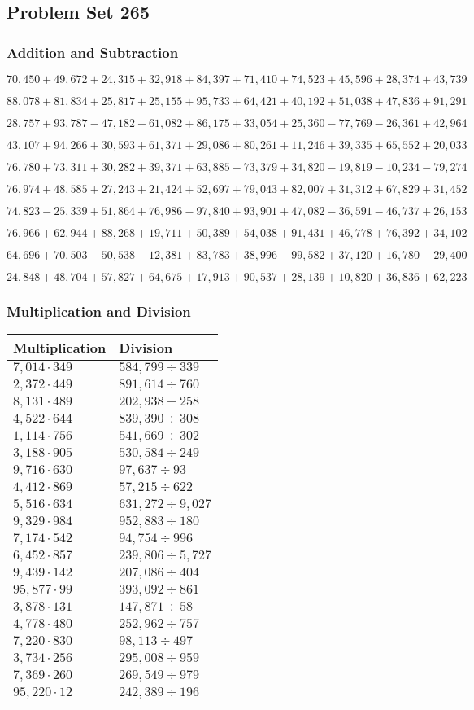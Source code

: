 \hypertarget{problem-set-265}{%
\subsection{Problem Set 265}\label{problem-set-265}}

\hypertarget{addition-and-subtraction}{%
\subsubsection{Addition and
Subtraction}\label{addition-and-subtraction}}

\(70,450+49,672+24,315+32,918+84,397+71,410+74,523+45,596+28,374+43,739\)

\(88,078+81,834+25,817+25,155+95,733+64,421+40,192+51,038+47,836+91,291\)

\(28,757+93,787-47,182-61,082+86,175+33,054+25,360-77,769-26,361+42,964\)

\(43,107+94,266+30,593+61,371+29,086+80,261+11,246+39,335+65,552+20,033\)

\(76,780+73,311+30,282+39,371+63,885-73,379+34,820-19,819-10,234-79,274\)

\(76,974+48,585+27,243+21,424+52,697+79,043+82,007+31,312+67,829+31,452\)

\(74,823-25,339+51,864+76,986-97,840+93,901+47,082-36,591-46,737+26,153\)

\(76,966+62,944+88,268+19,711+50,389+54,038+91,431+46,778+76,392+34,102\)

\(64,696+70,503-50,538-12,381+83,783+38,996-99,582+37,120+16,780-29,400\)

\(24,848+48,704+57,827+64,675+17,913+90,537+28,139+10,820+36,836+62,223\)

\hypertarget{multiplication-and-division}{%
\subsubsection{Multiplication and
Division}\label{multiplication-and-division}}

\begin{longtable}[]{@{}ll@{}}
\toprule
Multiplication & Division\tabularnewline
\midrule
\endhead
\(7,014\cdot349\) & \(584,799÷339\)\tabularnewline
\(2,372\cdot449\) & \(891,614÷760\)\tabularnewline
\(8,131\cdot489\) & \(202,938 - 258\)\tabularnewline
\(4,522\cdot644\) & \(839,390÷308\)\tabularnewline
\(1,114\cdot756\) & \(541,669÷302\)\tabularnewline
\(3,188\cdot905\) & \(530,584÷249\)\tabularnewline
\(9,716\cdot630\) & \(97,637÷93\)\tabularnewline
\(4,412\cdot869\) & \(57,215÷622\)\tabularnewline
\(5,516\cdot634\) & \(631,272÷9,027\)\tabularnewline
\(9,329\cdot984\) & \(952,883÷180\)\tabularnewline
\(7,174\cdot542\) & \(94,754÷996\)\tabularnewline
\(6,452\cdot857\) & \(239,806÷5,727\)\tabularnewline
\(9,439\cdot142\) & \(207,086÷404\)\tabularnewline
\(95,877\cdot99\) & \(393,092÷861\)\tabularnewline
\(3,878\cdot131\) & \(147,871÷58\)\tabularnewline
\(4,778\cdot480\) & \(252,962÷757\)\tabularnewline
\(7,220\cdot830\) & \(98,113÷497\)\tabularnewline
\(3,734\cdot256\) & \(295,008÷959\)\tabularnewline
\(7,369\cdot260\) & \(269,549÷979\)\tabularnewline
\(95,220\cdot12\) & \(242,389÷196\)\tabularnewline
\bottomrule
\end{longtable}
